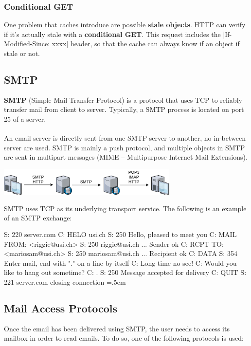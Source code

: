 \documentclass{article}
\newenvironment{lcverbatim}
 {\SaveVerbatim{cverb}}
 {\endSaveVerbatim
  \flushleft\fboxrule=0pt\fboxsep=.5em
  \colorbox{cverbbg}{%
    \makebox[\dimexpr\linewidth-2\fboxsep][l]{\BUseVerbatim{cverb}}%
  }
  \endflushleft
}
\begin{document}
\subsubsection{Conditional GET}
One problem that caches introduce are possible \textbf{stale objects}. HTTP can verify if it's actually stale with a \textbf{conditional GET}. This request includes the \cverb|If-Modified-Since: xxxx| header, so that the cache can always know if an object if stale or not.

\subsection{SMTP}
\textbf{SMTP} (Simple Mail Transfer Protocol) is a protocol that uses TCP to reliably transfer mail from client to server. Typically, a SMTP process is located on port 25 of a server. \\ \\
An email server is directly sent from one SMTP server to another, no in-between server are used. SMTP is mainly a push protocol, and multiple objects in SMTP are sent in multipart messages (MIME -- Multipurpose Internet Mail Extensions). \\

\centerline{\includegraphics[width=9cm]{./assets/smtp.png}}
\vspace{.6cm}
\noindent SMTP uses TCP as its underlying transport service. The following is an example of an SMTP exchange:

\begin{lcverbatim}
S: 220 server.com
C: HELO usi.ch
S: 250 Hello, pleased to meet you
C: MAIL FROM: <riggie@usi.ch>
S: 250 riggie@usi.ch ... Sender ok
C: RCPT TO: <mariosam@usi.ch>
S: 250 mariosam@usi.ch ... Recipient ok
C: DATA
S: 354 Enter mail, end with "." on a line by itself
C: Long time no see!
C: Would you like to hang out sometime?
C: .
S: 250 Message accepted for delivery
C: QUIT
S: 221 server.com closing connection
\end{lcverbatim}

\subsection{Mail Access Protocols}
Once the email has been delivered using SMTP, the user needs to access its mailbox in order to read emails. To do so, one of the following protocols is used:
\end{document}
